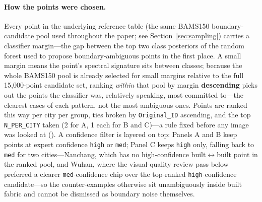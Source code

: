 \documentclass[remotesensing,article,submit,moreauthors]{Definitions/mdpi}
\begin{document}
\paragraph{How the points were chosen.} Every point in the underlying
reference table (the same BAMS150 boundary-candidate pool used throughout
the paper; see Section~\ref{sec:sampling}) carries a classifier margin---the
gap between the top two class posteriors of the random forest used to
propose boundary-ambiguous points in the first place. A small margin means
the point's spectral signature sits between classes; because the whole
BAMS150 pool is already selected for small margins relative to the full
15,000-point candidate set, ranking \emph{within} that pool by margin
\textbf{descending} picks out the points the classifier was, relatively
speaking, most committed to---the clearest cases of each pattern, not the
most ambiguous ones. Points are ranked this way per city per group, ties
broken by \texttt{Original\_ID} ascending, and the top \texttt{N\_PER\_CITY}
taken (2 for A, 1 each for B and C)---a rule fixed before any image was
looked at (). A confidence filter is
layered on top: Panels A and B keep points at expert confidence \texttt{high}
or \texttt{med}; Panel C keeps \texttt{high} only, falling back to
\texttt{med} for two cities---Nanchang, which has no high-confidence
built$\leftrightarrow$built point in the ranked pool, and Wuhan, where the
visual-quality review pass below preferred a clearer \texttt{med}-confidence
chip over the top-ranked \texttt{high}-confidence candidate---so the
counter-examples otherwise sit unambiguously inside built fabric and cannot
be dismissed as boundary noise themselves.
\end{document}
